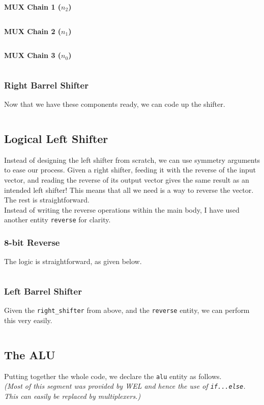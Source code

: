 \documentclass[a4paper, 11pt]{article}
\begin{document}
\textbf{MUX Chain 1 ($n_2$)}\\
\inputminted[linenos]{vhdl}{ALU_exp/mux_chain_1.vhd}
\newpage
\textbf{MUX Chain 2 ($n_1$)}\\
\inputminted[linenos]{vhdl}{ALU_exp/mux_chain_2.vhd}

\textbf{MUX Chain 3 ($n_0$)}\\
\inputminted[linenos]{vhdl}{ALU_exp/mux_chain_3.vhd}

\subsubsection*{Right Barrel Shifter}
Now that we have these components ready, we can code up the shifter.

\inputminted[linenos]{vhdl}{ALU_exp/right_shifter.vhd}

\subsection{Logical Left Shifter}
Instead of designing the left shifter from scratch, we can use symmetry arguments to ease our process. Given a right shifter, feeding it with the reverse of the input vector, and reading the reverse of its output vector gives the same result as an intended left shifter! This means that all we need is a way to reverse the vector. The rest is straightforward.\\

Instead of writing the reverse operations within the main body, I have used another entity \texttt{reverse} for clarity.
\subsubsection*{8-bit Reverse}
 
 The logic is straightforward, as given below.
 \inputminted[linenos]{vhdl}{ALU_exp/8bit_rev.vhd}

\subsubsection*{Left Barrel Shifter}
Given the \texttt{right\_shifter} from above, and the \texttt{reverse} entity, we can perform this very easily.
\inputminted[linenos]{vhdl}{ALU_exp/left_shifter.vhd}
\subsection{The ALU}
Putting together the whole code, we declare the \texttt{alu} entity as follows.\\
{\em(Most of this segment was provided by WEL and hence the use of \texttt{if...else}. This can easily be replaced by multiplexers.)}
\end{document}
